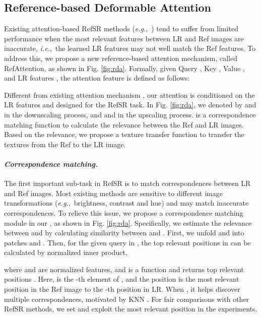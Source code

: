 \documentclass[runningheads]{llncs}
\def\ie{\mbox{\textit{i.e.}, }}
\def\eg{\mbox{\textit{e.g.}, }}
\begin{document}
\subsection{Reference-based Deformable Attention} 

Existing attention-based RefSR methods (\eg \cite{yang2020learning}) tend to suffer from limited performance when the most relevant features between LR and Ref images are inaccurate, \ie the learned LR features may not well match the Ref features. 
To address this, we propose a new reference-based attention mechanism, called RefAttention, as shown in Fig. \ref{fig:rda}.
Formally, given Query , Key , Value , and LR features , the attention feature  is defined as follows:

Different from existing attention mechanism \cite{vaswani2017attention}, our attention is conditioned on the LR features and designed for the RefSR task.
In Fig. \ref{fig:rda}, we denoted by  and  in the downscaling process, and  and  in the upscaling process.
 is a correspondence matching function to calculate the relevance between the Ref and LR images.
Based on the relevance, we propose a texture transfer function  to transfer the textures from the Ref to the LR image.


\paragraph{\textbf{\emph{Correspondence matching.}}}
The first important sub-task in RefSR is to match correspondences between LR and Ref images.
Most existing methods \cite{zhang2019image,yang2020learning} are sensitive to different image transformations (\eg brightness, contrast and hue) and may match inaccurate correspondences.
To relieve this issue, we propose a correspondence matching module in our , as shown in Fig. \ref{fig:rda}.
Specifically, we estimate the relevance between  and  by calculating similarity between  and .
First, we unfold  and  into patches  and .
Then, for the given query  in , the top  relevant positions in  can be calculated by normalized inner product, 

where  and  are normalized features, and  is a function and returns top  relevant positions . 
Here,  is the -th element of , and the position  is the most relevant position in the Ref image to the -th position in LR.
When , it helps discover multiple correspondences, motivated by KNN \cite{Liu_2015_CVPR}.
For fair comparisons with other RefSR methods, we set  and exploit the most relevant position in the experiments.
\end{document}
